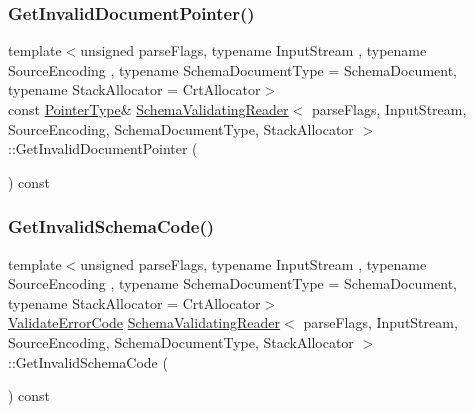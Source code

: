 \mbox{\label{classSchemaValidatingReader_a53051bfc38cb24368fc40e4334102da8}} 
\subsubsection{\texorpdfstring{Get\+Invalid\+Document\+Pointer()}{GetInvalidDocumentPointer()}}
{\footnotesize\ttfamily template$<$unsigned parse\+Flags, typename Input\+Stream , typename Source\+Encoding , typename Schema\+Document\+Type  = Schema\+Document, typename Stack\+Allocator  = Crt\+Allocator$>$ \\
const \hyperlink{classSchemaValidatingReader_a30ecf1b20ca5a1b79e0d5f4ceb3bf198}{Pointer\+Type}\& \hyperlink{classSchemaValidatingReader}{Schema\+Validating\+Reader}$<$ parse\+Flags, Input\+Stream, Source\+Encoding, Schema\+Document\+Type, Stack\+Allocator $>$\+::Get\+Invalid\+Document\+Pointer (\begin{DoxyParamCaption}{ }\end{DoxyParamCaption}) const\hspace{0.3cm}{\ttfamily [inline]}}

\mbox{\label{classSchemaValidatingReader_a625f4a209960ad79485d3c8e9bc23fbb}} 
\subsubsection{\texorpdfstring{Get\+Invalid\+Schema\+Code()}{GetInvalidSchemaCode()}}
{\footnotesize\ttfamily template$<$unsigned parse\+Flags, typename Input\+Stream , typename Source\+Encoding , typename Schema\+Document\+Type  = Schema\+Document, typename Stack\+Allocator  = Crt\+Allocator$>$ \\
\hyperlink{group__RAPIDJSON__ERRORS_ga2e1f88f94a5d9a6817a5de0ed2f0105a}{Validate\+Error\+Code} \hyperlink{classSchemaValidatingReader}{Schema\+Validating\+Reader}$<$ parse\+Flags, Input\+Stream, Source\+Encoding, Schema\+Document\+Type, Stack\+Allocator $>$\+::Get\+Invalid\+Schema\+Code (\begin{DoxyParamCaption}{ }\end{DoxyParamCaption}) const\hspace{0.3cm}{\ttfamily [inline]}}

